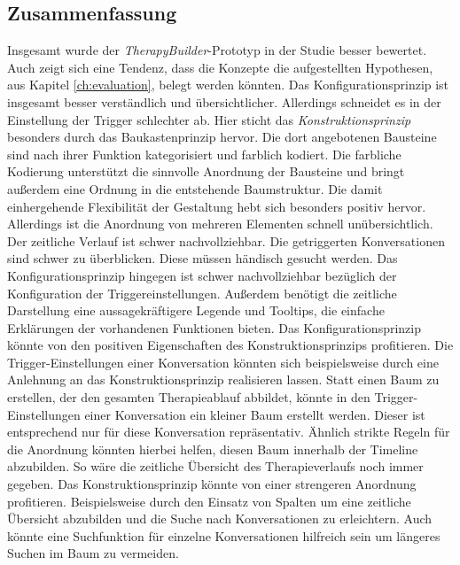 \subsection{Zusammenfassung}
Insgesamt wurde der \emph{TherapyBuilder}-Prototyp in der Studie besser bewertet. Auch zeigt sich eine Tendenz, dass die Konzepte die aufgestellten Hypothesen, aus Kapitel \ref{ch:evaluation}, belegt werden könnten. Das Konfigurationsprinzip ist insgesamt besser verständlich und übersichtlicher. Allerdings schneidet es in der Einstellung der Trigger schlechter ab. Hier sticht das \emph{Konstruktionsprinzip} besonders durch das Baukastenprinzip hervor. Die dort angebotenen Bausteine sind nach ihrer Funktion kategorisiert und farblich kodiert. Die farbliche Kodierung unterstützt die sinnvolle Anordnung der Bausteine und bringt außerdem eine Ordnung in die entstehende Baumstruktur. Die damit einhergehende Flexibilität der Gestaltung hebt sich besonders positiv hervor. Allerdings ist die Anordnung von mehreren Elementen schnell unübersichtlich. Der zeitliche Verlauf ist schwer nachvollziehbar. Die getriggerten Konversationen sind schwer zu überblicken. Diese müssen händisch gesucht werden. Das Konfigurationsprinzip hingegen ist schwer nachvollziehbar bezüglich der Konfiguration der Triggereinstellungen. Außerdem benötigt die zeitliche Darstellung eine aussagekräftigere Legende und Tooltips, die einfache Erklärungen der vorhandenen Funktionen bieten. Das Konfigurationsprinzip könnte von den positiven Eigenschaften des Konstruktionsprinzips profitieren. Die Trigger-Einstellungen einer Konversation könnten sich beispielsweise durch eine Anlehnung an das Konstruktionsprinzip realisieren lassen. Statt einen Baum zu erstellen, der den gesamten Therapieablauf abbildet, könnte in den Trigger-Einstellungen einer Konversation ein kleiner Baum erstellt werden. Dieser ist entsprechend nur für diese Konversation repräsentativ. Ähnlich strikte Regeln für die Anordnung könnten hierbei helfen, diesen Baum innerhalb der Timeline abzubilden. So wäre die zeitliche Übersicht des Therapieverlaufs noch immer gegeben. Das Konstruktionsprinzip könnte von einer strengeren Anordnung profitieren. Beispielsweise durch den Einsatz von Spalten um eine zeitliche Übersicht abzubilden und die Suche nach Konversationen zu erleichtern. Auch könnte eine Suchfunktion für einzelne Konversationen hilfreich sein um längeres Suchen im Baum zu vermeiden.

